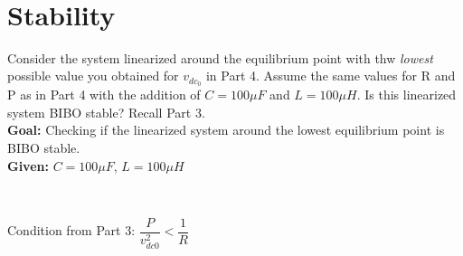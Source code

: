 \documentclass[12pt]{article}
\begin{document}
\

\section{Stability}
Consider the system linearized around the equilibrium point with thw \textit{lowest} possible value you obtained for $v_{dc_0}$ in Part 4. Assume the same values for R and P as in Part 4 with the addition of $C = 100\mu F$ and $L = 100\mu H$. Is this linearized system BIBO stable? Recall Part 3.\\

\textbf{Goal: }Checking if the linearized system around the lowest equilibrium point is BIBO stable.\\

\textbf{Given: }$C = 100\mu F$, $L = 100\mu H$

\

\begin{tcolorbox}[enhanced, frame hidden, colback=white, borderline west={1pt}{0pt}{gray}]
  Condition from Part 3: $\dfrac{P}{v^2_{dc0}} < \dfrac{1}{R}$
\end{tcolorbox}

\
\end{document}
